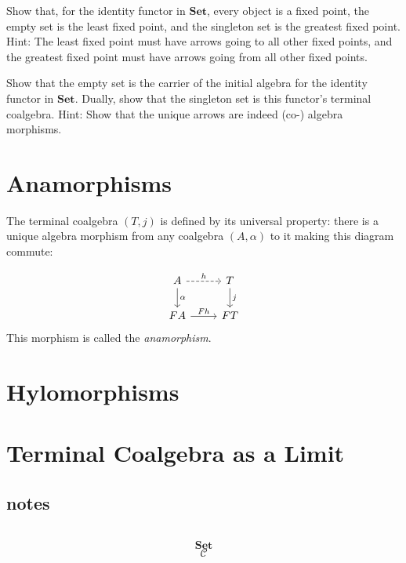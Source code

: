 \documentclass[DaoFP]{subfiles}
\begin{document}
\begin{exercise}
Show that, for the identity functor in $\mathbf{Set}$, every object is a fixed point, the empty set is the least fixed point, and the singleton set is the greatest fixed point. Hint: The least fixed point must have arrows going to all other fixed points, and the greatest fixed point must have arrows going from all other fixed points.
\end{exercise}

\begin{exercise}
Show that the empty set is the carrier of the initial algebra for the identity functor in $\mathbf{Set}$. Dually, show that the singleton set is this functor's terminal coalgebra. Hint: Show that the unique arrows are indeed (co-) algebra morphisms.
\end{exercise}

\section{Anamorphisms}

The terminal coalgebra $(T, j)$ is defined by its universal property: there is a unique algebra morphism from any coalgebra $(A, \alpha)$ to it making this diagram commute:

\[
 \begin{tikzcd}
 A 
 \arrow[r, dashed, "h"]
 \arrow[d, "\alpha"]
 & T
\arrow[d, "j"]
 \\
 F A
 \arrow[r,  "F h"]
 & F T
  \end{tikzcd}
\]
 This morphism is called the \emph{anamorphism}.

\section{Hylomorphisms}

\section{Terminal Coalgebra as a Limit}


\subsection{notes}


\begin{exercise}
\end{exercise}

\begin{haskell}
\end{haskell}

\[
 \begin{tikzcd}
  \end{tikzcd}
\]

\[   \mathbf{Set} \]
\[   \mathcal{C} \]
\end{document}
